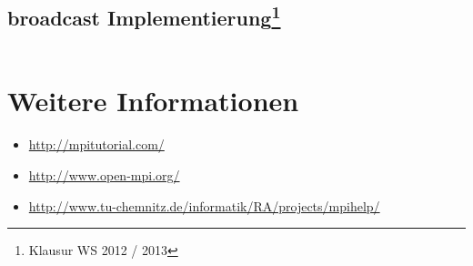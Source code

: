 \subsection[broadcast Implementierung]{broadcast Implementierung\footnote{Klausur WS 2012 / 2013}}%
\inputminted[numbersep=5pt, tabsize=4]{c}{scripts/mpi/mpi-mybroadcast.c}

\section{Weitere Informationen}
\begin{itemize}
    \item \url{http://mpitutorial.com/}
    \item \url{http://www.open-mpi.org/}
    \item \url{http://www.tu-chemnitz.de/informatik/RA/projects/mpihelp/}
\end{itemize}

